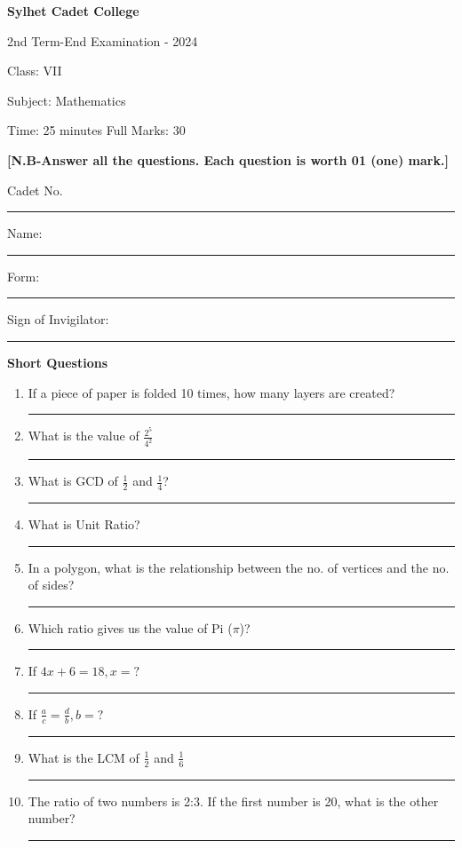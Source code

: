\documentclass{exam}
\begin{document}
\begin{center}
  \bfseries\large
  Sylhet Cadet College

\normalsize
2nd Term-End Examination - 2024

  Class: VII
  
  Subject: Mathematics

  Time: 25 minutes \qquad \qquad  \qquad \qquad \qquad  \qquad \qquad  \qquad Full Marks: 30

\end{center}


 \begin{center} \textbf{[N.B-Answer all the questions. Each question is worth 01 (one) mark.]}\\


\vspace{0.5cm}

Cadet No. \noindent\rule{1cm}{0.4pt} \qquad Name: \noindent\rule{2cm}{0.4pt}  
Form: \noindent\rule{1cm}{0.4pt} Sign of Invigilator: \noindent\rule{2cm}{0.4pt}
 
\end{center}

\textbf{Short Questions}

\begin{enumerate}

\item If a piece of paper is folded 10 times, how many layers are created? \noindent\rule{2cm}{0.4pt}

\item What is the value of $\frac{2^5}{4^2}$ \noindent\rule{2cm}{0.4pt}

\item What is GCD of $\frac12$ and $\frac14$? \noindent\rule{2cm}{0.4pt}

\item What is Unit Ratio? \noindent\rule{2cm}{0.4pt}

\item In a polygon, what is the relationship between the no. of vertices and
the no. of sides? \noindent\rule{2cm}{0.4pt}

\item Which ratio gives us the value of Pi ($\pi$)? \noindent\rule{2cm}{0.4pt}

\item If $4x+6 = 18, x = ?$  \noindent\rule{2cm}{0.4pt}

\item If $\frac ac = \frac db, b = ?$ \noindent\rule{2cm}{0.4pt}

\item What is the LCM of $\frac 12$ and $\frac 16$ \noindent\rule{2cm}{0.4pt}

\item The ratio of two numbers is 2:3. If the first number is 20, what is 
the other number? \noindent\rule{2cm}{0.4pt}


\end{enumerate}
\end{document}
